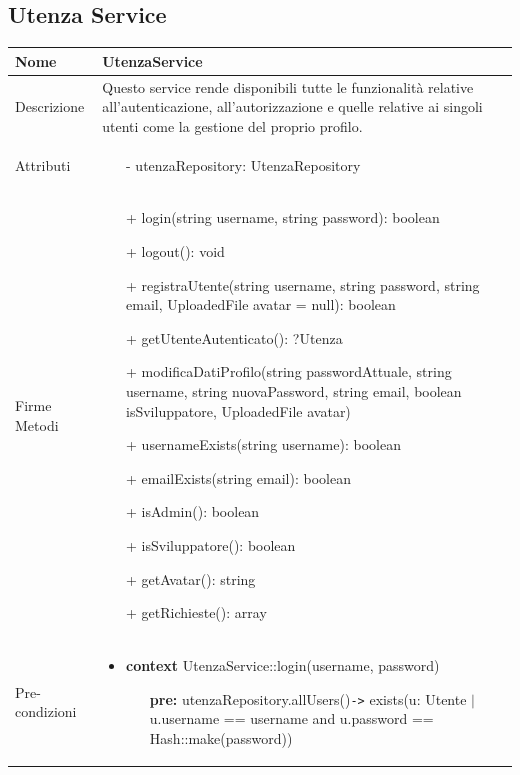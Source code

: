 \subsection{Utenza Service}
\small\begin{tabular}{|| l | p{34em} ||} 
	\hline
	Nome & UtenzaService\\
	\hline
	Descrizione & Questo service rende disponibili tutte le funzionalità relative all'autenticazione, all'autorizzazione e quelle relative ai singoli utenti come la gestione del proprio profilo. \\
	\hline
	Attributi & \begin{itemize}
		\item[-] utenzaRepository: UtenzaRepository
	\end{itemize}\\
	\hline
	Firme Metodi & \begin{itemize}
		\item[+] login(string username, string password): boolean
		\item[+] logout(): void
		\item[+] registraUtente(string username, string password, string email, UploadedFile avatar = null): boolean
		\item[+] getUtenteAutenticato(): ?Utenza
		\item[+] modificaDatiProfilo(string passwordAttuale, string username, string nuovaPassword, string email, boolean isSviluppatore, UploadedFile avatar)
		\item[+] usernameExists(string username): boolean
		\item[+] emailExists(string email): boolean
		\item[+] isAdmin(): boolean 
		\item[+] isSviluppatore(): boolean 
		\item[+] getAvatar(): string 
		\item[+] getRichieste(): array 
	\end{itemize}\\
	\hline
Pre-condizioni & \begin{itemize}[leftmargin=*]
	\item \textbf{context} UtenzaService::login(username, password)
	\begin{itemize}
		\item[ ] \textbf{pre:} utenzaRepository.allUsers()\verb|->| exists(u: Utente $|$ u.username == username and u.password == Hash::make(password))
	\end{itemize}


\end{itemize}
\end{tabular}
